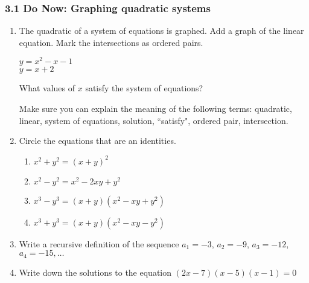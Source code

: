 \documentclass[12pt, twoside]{article}
\begin{document}
\subsubsection*{3.1 Do Now: Graphing quadratic systems}
\begin{enumerate}
  \item The quadratic of a system of equations is graphed. Add a graph of the linear equation. Mark the intersections as ordered pairs.

  \begin{multicols}{2}
    $y = x^2 - x - 1$ \\
    \columnbreak
    $y = x + 2$
    \end{multicols}
    What values of $x$ satisfy the system of equations? \vspace{2cm}

  \begin{center}
  \end{center}
Make sure you can explain the meaning of the following terms: quadratic, linear, system of equations, solution, ``satisfy", ordered pair, intersection.

\newpage
\item Circle the equations that are an identities.
    \begin{multicols}{2}
      \begin{enumerate}
        \item \(x^2 + y^2 = (x + y)^2\)
        \item \(x^2 - y^2 = x^2 - 2xy + y^2\)
        \item \(x^3 - y^3 = (x + y)(x^2 - xy + y^2)\)
        \item \(x^3 + y^3 = (x + y)(x^2 - xy - y^2)\)
      \end{enumerate}
    \end{multicols}

\item Write a recursive definition of the sequence $a_1 = -3$, $a_2 = -9$, $a_3 = -12$, $a_4 = -15, \ldots$ \vspace{2cm}
    
\item Write down the solutions to the equation $(2x-7)(x - 5)(x - 1) = 0$ \vspace{2cm}


\end{enumerate}
\end{document}
